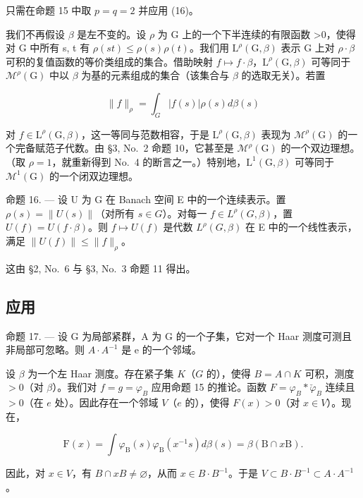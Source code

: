 只需在命题 15 中取 \(p = q = 2\) 并应用 (16)。

我们不再假设 \(\beta\) 是左不变的。设 \(\rho\) 为 G 上的一个下半连续的有限函数 \textgreater0，使得对 G 中所有 s, t 有 \(\rho(st) \leqslant \rho(s)\rho(t)\)。我们用 \(\mathrm{L}^{\rho}(\mathrm{G}, \beta)\) 表示 G 上对 \(\rho \cdot \beta\) 可积的复值函数的等价类组成的集合。借助映射 \(f \mapsto f \cdot \beta\)，\(\mathrm{L}^{\rho}(\mathrm{G}, \beta)\) 可等同于 \(\mathcal{M}^{\rho}(\mathrm{G})\) 中以 \(\beta\) 为基的元素组成的集合（该集合与 \(\beta\) 的选取无关）。若置

\[
\| f \| _ {\rho} = \int_ {G} | f (s) | \rho (s) d \beta (s)
\]

对 \(f \in \mathrm{L}^{\rho}(\mathrm{G},\beta)\)，这一等同与范数相容，于是 \(\mathrm{L}^{\rho}(\mathrm{G},\beta)\) 表现为 \(\mathcal{M}^{\rho}(\mathrm{G})\) 的一个完备赋范子代数。由 §3, No.~2 命题 10，它甚至是 \(\mathcal{M}^{\rho}(\mathrm{G})\) 的一个双边理想。（取 \(\rho = 1\)，就重新得到 No.~4 的断言之一。）特别地，\(\mathrm{L}^{1}(\mathrm{G},\beta)\) 可等同于 \(\mathcal{M}^{1}(\mathrm{G})\) 的一个闭双边理想。

命题 16. --- 设 U 为 G 在 Banach 空间 E 中的一个连续表示。置 \(\rho(s) = \|U(s)\|\)（对所有 \(s \in G\)）。对每一 \(f \in L^{\rho}(G, \beta)\)，置 \(U(f) = U(f \cdot \beta)\)。则 \(f \mapsto U(f)\) 是代数 \(L^{\rho}(G, \beta)\) 在 E 中的一个线性表示，满足 \(\|U(f)\| \leqslant \|f\|_{\rho}\)。

这由 §2, No.~6 与 §3, No.~3 命题 11 得出。

\subsection{应用}

命题 17. --- 设 G 为局部紧群，A 为 G 的一个子集，它对一个 Haar 测度可测且非局部可忽略。则 \(A \cdot A^{-1}\) 是 e 的一个邻域。

设 \(\beta\) 为一个左 Haar 测度。存在紧子集 \(K\)（\(G\) 的），使得 \(B = A \cap K\) 可积，测度 \(>0\)（对 \(\beta\)）。我们对 \(f = g = \varphi_{B}\) 应用命题 15 的推论。函数 \(F = \varphi_{B} * \check{\varphi}_{B}\) 连续且 \(>0\)（在 \(e\) 处）。因此存在一个邻域 \(V\)（\(e\) 的），使得 \(F(x) > 0\)（对 \(x \in V\)）。现在，

\[
\mathrm{F} (x) = \int \varphi_ {\mathrm{B}} (s) \varphi_ {\mathrm{B}} (x ^ {- 1} s) d \beta (s) = \beta (\mathrm{B} \cap x \mathrm{B}).
\]

因此，对 \(x \in V\)，有 \(B \cap xB \neq \varnothing\)，从而 \(x \in B \cdot B^{-1}\)。于是 \(V \subset B \cdot B^{-1} \subset A \cdot A^{-1}\)。

